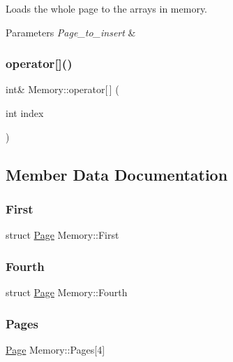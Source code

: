 Loads the whole page to the arrays in memory. 


\begin{DoxyParams}{Parameters}
{\em Page\+\_\+to\+\_\+insert} & \\
\hline
\end{DoxyParams}
\mbox{\label{classMemory_abeefba4f18f5396c0635003bc028b013}} 
\subsubsection{\texorpdfstring{operator[]()}{operator[]()}}
{\footnotesize\ttfamily int\& Memory\+::operator\mbox{[}$\,$\mbox{]} (\begin{DoxyParamCaption}\item[{int}]{index }\end{DoxyParamCaption})}



\subsection{Member Data Documentation}
\mbox{\label{classMemory_a0ca580503ffbb69a827aabba7d07de15}} 
\subsubsection{\texorpdfstring{First}{First}}
{\footnotesize\ttfamily struct \mbox{\hyperlink{structPage}{Page}} Memory\+::\+First}

\mbox{\label{classMemory_acc3cf7dc633add0087fb73343ecc974b}} 
\subsubsection{\texorpdfstring{Fourth}{Fourth}}
{\footnotesize\ttfamily struct \mbox{\hyperlink{structPage}{Page}} Memory\+::\+Fourth}

\mbox{\label{classMemory_a9cc9097c17efefe4dd48f2f1c34febd0}} 
\subsubsection{\texorpdfstring{Pages}{Pages}}
{\footnotesize\ttfamily \mbox{\hyperlink{structPage}{Page}} Memory\+::\+Pages\mbox{[}4\mbox{]}}

